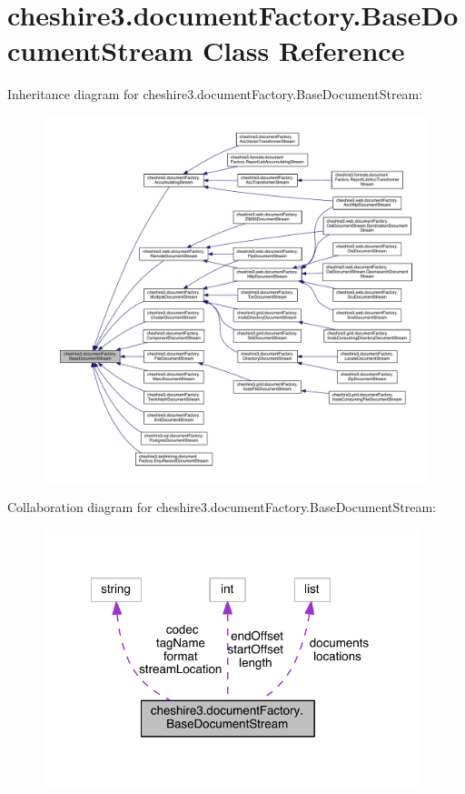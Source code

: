 \hypertarget{classcheshire3_1_1document_factory_1_1_base_document_stream}{\section{cheshire3.\-document\-Factory.\-Base\-Document\-Stream Class Reference}
\label{classcheshire3_1_1document_factory_1_1_base_document_stream}
}


Inheritance diagram for cheshire3.\-document\-Factory.\-Base\-Document\-Stream\-:
\nopagebreak
\begin{figure}[H]
\begin{center}
\leavevmode
\includegraphics[width=350pt]{classcheshire3_1_1document_factory_1_1_base_document_stream__inherit__graph}
\end{center}
\end{figure}


Collaboration diagram for cheshire3.\-document\-Factory.\-Base\-Document\-Stream\-:
\nopagebreak
\begin{figure}[H]
\begin{center}
\leavevmode
\includegraphics[width=309pt]{classcheshire3_1_1document_factory_1_1_base_document_stream__coll__graph}
\end{center}
\end{figure}
